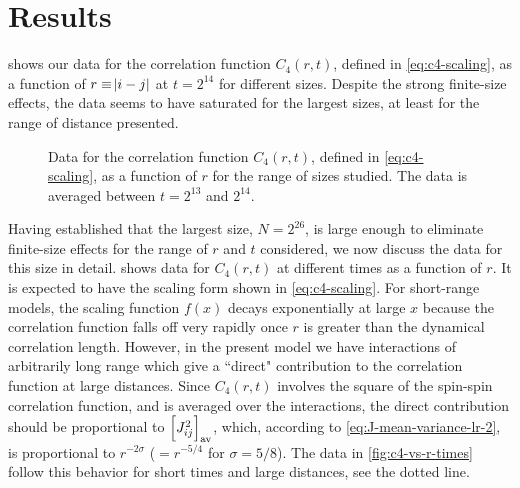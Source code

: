 \section{Results}

 shows our data for the correlation function $C_4(r,t)$,
defined in \cref{eq:c4-scaling}, as a function of $r\equiv\abs{i-j}$ at
$t=2^{14}$ for different sizes. Despite the strong finite-size effects, the data
seems to have saturated for the largest sizes, at least for the range of distance
presented.
\begin{figure}
  \centering
  
  \caption[
    Data for the correlation function averaged between $t=2^{13}$ and $2^{14}$
    for different sizes of the one-dimensional long-range diluted spin glass
    with $\sigma=5/8$ at $T=0.4T_c$.
  ]
  {
    Data for the correlation function $C_4(r,t)$, defined in \cref{eq:c4-scaling},
    as a function of $r$ for the range of sizes studied. The data is averaged
    between $t=2^{13}$ and $2^{14}$.
  } \label{fig:c4-vs-r-sizes}
\end{figure}

Having established that the largest size, $N=2^{26}$, is large enough to
eliminate finite-size effects for the range of $r$ and $t$ considered, we now
discuss the data for this size in detail.  shows data
for $C_4(r,t)$ at different times as a function of $r$. It is expected to have
the scaling form shown in \cref{eq:c4-scaling}. For short-range models, the
scaling function $f(x)$ decays exponentially at large $x$ because the
correlation function falls off very rapidly once $r$ is greater than the
dynamical correlation length. However, in the present model we have
interactions of arbitrarily long range which give a ``direct" contribution to
the correlation function at large distances. Since $C_4(r,t)$ involves the
square of the spin-spin correlation function, and is averaged over the
interactions, the direct contribution should be proportional to
$\left[J_{ij}^2\right]_{\mathrm{av}}$, which, according to \cref{eq:J-mean-variance-lr-2}, is
proportional to $r^{-2\sigma}$ ($=r^{-5/4}$ for $\sigma=5/8$). The data in
\cref{fig:c4-vs-r-times} follow this behavior for short times and large
distances, see the dotted line.

